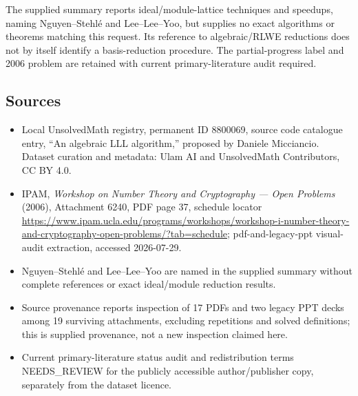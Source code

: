 \documentclass[11pt]{article}
\begin{document}
The supplied summary reports ideal/module-lattice techniques and speedups, naming Nguyen--Stehlé and Lee--Lee--Yoo, but supplies no exact algorithms or theorems matching this request. Its reference to algebraic/RLWE reductions does not by itself identify a basis-reduction procedure. The partial-progress label and 2006 problem are retained with current primary-literature audit required.
\subsection{Sources}
\begin{itemize}
\item Local UnsolvedMath registry, permanent ID 8800069, source code catalogue entry, ``An algebraic LLL algorithm,'' proposed by Daniele Micciancio. Dataset curation and metadata: Ulam AI and UnsolvedMath Contributors, CC BY 4.0.
\item IPAM, \emph{Workshop on Number Theory and Cryptography --- Open Problems} (2006), Attachment 6240, PDF page 37, schedule locator \url{https://www.ipam.ucla.edu/programs/workshops/workshop-i-number-theory-and-cryptography-open-problems/?tab=schedule}; pdf-and-legacy-ppt visual-audit extraction, accessed 2026-07-29.
\item Nguyen--Stehlé and Lee--Lee--Yoo are named in the supplied summary without complete references or exact ideal/module reduction results.
\item Source provenance reports inspection of 17 PDFs and two legacy PPT decks among 19 surviving attachments, excluding repetitions and solved definitions; this is supplied provenance, not a new inspection claimed here.
\item Current primary-literature status audit and redistribution terms NEEDS\_REVIEW for the publicly accessible author/publisher copy, separately from the dataset licence.
\end{itemize}
\end{document}

